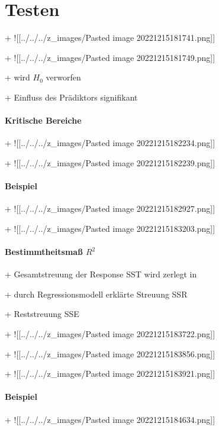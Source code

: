 \documentclass[10pt]{report}
\begin{document}
\chapter{Testen}\label{ch:Testen}

+ ![[../../../z\_images/Pasted image 20221215181741.png]]

+ ![[../../../z\_images/Pasted image 20221215181749.png]]

+ wird $H_0$ verworfen

+ Einfluss des Prädiktors signifikant


\subsubsection{Kritische Bereiche}

+ ![[../../../z\_images/Pasted image 20221215182234.png]]

+ ![[../../../z\_images/Pasted image 20221215182239.png]]


\subsubsection{Beispiel}

+ ![[../../../z\_images/Pasted image 20221215182927.png]]

+ ![[../../../z\_images/Pasted image 20221215183203.png]]


\subsubsection{Bestimmtheitsmaß $R^2$}

+ Gesamtstreuung der Response SST wird zerlegt in

+ durch Regressionsmodell erklärte Streuung SSR

+ Reststreuung SSE

+ ![[../../../z\_images/Pasted image 20221215183722.png]]

+ ![[../../../z\_images/Pasted image 20221215183856.png]]

+ ![[../../../z\_images/Pasted image 20221215183921.png]]


\subsubsection{Beispiel}

+ ![[../../../z\_images/Pasted image 20221215184634.png]]
\end{document}
